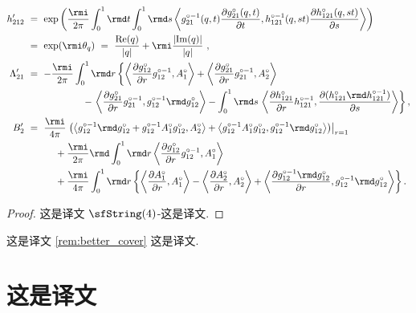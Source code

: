 \documentclass[
    affil-it, %
    auth-lg, %
    british, %
    compression, %
    contents, %
    custom-packages={}, %
    references={bigone}, %
]{lib/preprint}
\renewcommand{\Re}{\mathrm{Re}}
\renewcommand{\Im}{\mathrm{Im}}
\begin{document}
\begin{body}
\begin{theorem}
\begin{subequations}
\begin{equation}
\begin{aligned}
                        h'_{212}\ &=\ \exp\left(\frac{\rmi}{2\pi}\int_{0}^{1}\rmd t \int_{0}^{1}\rmd s\innerLarge{g_{21}^{\circ-1}(q,t)\parder[g^\circ_{21}(q,t)]{t}}{h^{\circ-1}_{121}(q,st)\parder[h^{\circ}_{121}(q,st)]{s}}\right) 
                        \\
                        &=\ \exp(\rmi\theta_q)\ =\ \frac{\Re(q)}{|q|}+\rmi\frac{|\Im(q)|}{|q|}~,
                        \\
                        \Lambda'_{21}\ &=\ -\frac{\rmi}{2\pi}\int_0^1\rmd r\left\{\innerLarge{\parder[g^\circ_{12}]{r}g_{12}^{\circ-1}}{A^\circ_1}+\innerLarge{\parder[g^\circ_{21}]{r}g_{21}^{\circ-1}}{A^\circ_2}\right.
                        \\
                        &\kern2cm-\left.\innerLarge{\parder[g^\circ_{21}]{r}g_{21}^{\circ-1}}{g_{12}^{\circ-1} \rmd g^\circ_{12}}-\int_{0}^{1}\rmd s\,\innerLarge{\parder[h^\circ_{121}]{r}h_{121}^{\circ-1}}{\parder[(h^\circ_{121}\rmd h_{121}^{\circ-1})]{s}}\right\},
                        \\
                        B'_{2}\ &=\ \frac{\rmi}{4\pi}\left.\left(\innerLarge{g_{12}^{\circ-1}\rmd g^\circ_{12} + g_{12}^{\circ-1} A^\circ_1 g^\circ_{12}}{A^\circ_2} +\innerLarge{g_{12}^{\circ-1} A^\circ_1 g^\circ_{12}}{g_{12}^{\circ-1}\rmd g^\circ_{12}}\right)\right|_{r=1}
                        \\
                        &\kern1cm+\frac{\rmi}{2\pi}\rmd\int_0^1\rmd r\innerLarge{\parder[g^\circ_{12}]{r}g_{12}^{\circ-1}}{A^\circ_1} 
                        \\
                        &\kern1cm+\frac{\rmi}{4\pi}\int_0^1\rmd r\left\{\innerLarge{\parder[A^\circ_1]{r}}{A^\circ_1}-\innerLarge{\parder[A^\circ_2]{r}}{A^\circ_2}+\innerLarge{\parder[g_{12}^{\circ-1}\rmd g^\circ_{12}]{r}}{g_{12}^{\circ-1}\rmd g^\circ_{12}}\right\}.
                    \end{aligned}
                \end{equation}
            \end{subequations}
        \end{theorem}
        \begin{proof}
            这是译文 $\sfString(4)$-这是译文.
        \end{proof}
        
\noindent 这是译文 \cref{rem:better_cover} 这是译文.
        
        \section{这是译文}
        

\end{body}
\end{document}
